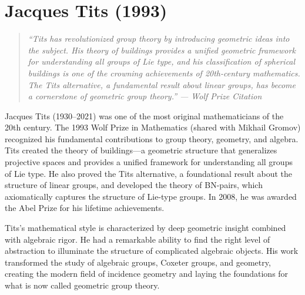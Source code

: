 \let\R\relax
\newcommand{\R}{\mathbb{R}}
\let\C\relax
\newcommand{\C}{\mathbb{C}}
\let\N\relax
\newcommand{\N}{\mathbb{N}}
\let\Z\relax
\newcommand{\Z}{\mathbb{Z}}
\let\Q\relax
\newcommand{\Q}{\mathbb{Q}}
\let\SO\relax
\newcommand{\SO}{\operatorname{SO}}
\let\SL\relax
\newcommand{\SL}{\operatorname{SL}}
\let\GL\relax
\newcommand{\GL}{\operatorname{GL}}
\let\St\relax
\newcommand{\St}{\operatorname{St}}
\let\GV\relax
\newcommand{\GV}{\operatorname{GV}}
\let\E\relax
\newcommand{\E}{\operatorname{E}}
\let\Sp\relax
\newcommand{\Sp}{\operatorname{Sp}}
\let\Aut\relax
\newcommand{\Aut}{\operatorname{Aut}}
\let\ad\relax
\newcommand{\ad}{\operatorname{ad}}
\let\PSL\relax
\newcommand{\PSL}{\operatorname{PSL}}
\let\PSp\relax
\newcommand{\PSp}{\operatorname{PSp}}
\let\PSU\relax
\newcommand{\PSU}{\operatorname{PSU}}

\chapter{Jacques Tits (1993)}

\begin{quote}
\it ``Tits has revolutionized group theory by introducing geometric ideas into the subject. His theory of buildings provides a unified geometric framework for understanding all groups of Lie type, and his classification of spherical buildings is one of the crowning achievements of 20th-century mathematics. The Tits alternative, a fundamental result about linear groups, has become a cornerstone of geometric group theory.'' --- Wolf Prize Citation
\end{quote}

Jacques Tits (1930--2021) was one of the most original mathematicians of the 20th century. The 1993 Wolf Prize in Mathematics (shared with Mikhail Gromov) recognized his fundamental contributions to group theory, geometry, and algebra. Tits created the theory of buildings---a geometric structure that generalizes projective spaces and provides a unified framework for understanding all groups of Lie type. He also proved the Tits alternative, a foundational result about the structure of linear groups, and developed the theory of BN-pairs, which axiomatically captures the structure of Lie-type groups. In 2008, he was awarded the Abel Prize for his lifetime achievements.

Tits's mathematical style is characterized by deep geometric insight combined with algebraic rigor. He had a remarkable ability to find the right level of abstraction to illuminate the structure of complicated algebraic objects. His work transformed the study of algebraic groups, Coxeter groups, and geometry, creating the modern field of incidence geometry and laying the foundations for what is now called geometric group theory.

